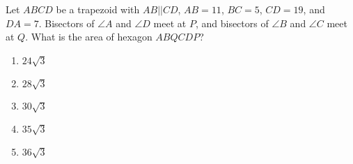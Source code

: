Let $ABCD$ be a trapezoid with $AB||CD$, $AB=11$, $BC=5$, $CD=19$, and $DA=7$. Bisectors of $\angle A$ and $\angle D$ meet at $P$, and bisectors of $\angle B$ and $\angle C$ meet at $Q$. What is the area of hexagon $ABQCDP$?

\begin{enumerate}
\item $24\sqrt{3}$
\item $28\sqrt{3}$
\item $30\sqrt{3}$
\item $35\sqrt{3}$
\item $36\sqrt{3}$
\end{enumerate}
